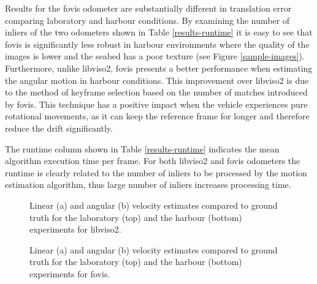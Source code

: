 \documentclass[conference]{IEEEtran}
\begin{document}
Results for the fovis odometer are substantially different in translation error comparing laboratory and harbour conditions. By examining the number of inliers of the two odometers shown in Table \ref{results-runtime} it is easy to see that fovis is significantly less robust in harbour environments where the quality of the images is lower and the seabed has a poor texture (see Figure \ref{sample-images}). Furthermore, unlike libviso2, fovis presents a better performance when estimating the angular motion in harbour conditions. This improvement over libviso2 is due to the method of keyframe selection based on the number of matches introduced by fovis. This technique has a positive impact when the vehicle experiences pure rotational movements, as it can keep the reference frame for longer and therefore reduce the drift significantly.

The runtime column shown in Table \ref{results-runtime} indicates the mean algorithm execution time per frame. For both libviso2 and fovis odometers the runtime is clearly related to the number of inliers to be processed by the motion estimation algorithm, thus large number of inliers increases processing time.

\begin{figure}
  \begin{center}
  \end{center}
  \caption{Linear (a) and angular (b) velocity estimates compared to ground truth for the laboratory (top) and the harbour (bottom) experiments for libviso2.}
  \label{error-plots-viso2}
\end{figure}

\begin{figure}[!h]
  \begin{center}
  \end{center}
  \caption{Linear (a) and angular (b) velocity estimates compared to ground truth for the laboratory (top) and the harbour (bottom) experiments for fovis.}
  \label{error-plots-fovis}
\end{figure}
\end{document}
